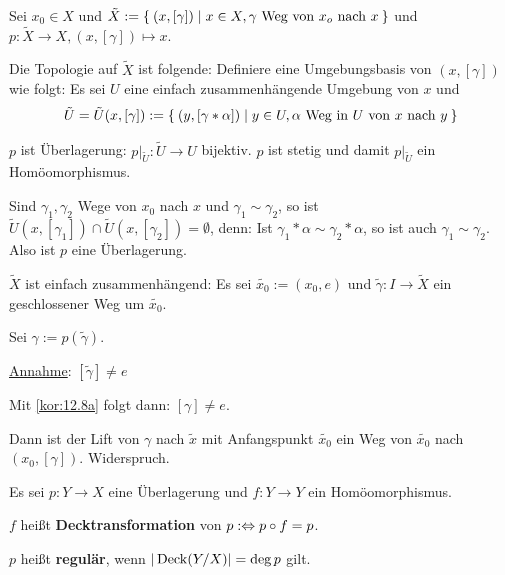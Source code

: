 \begin{beweis}
    Sei $x_0 \in X$ und $\tilde{X} := \Set{(x, [\gamma]) | x \in X, \gamma \text{ Weg von } x_o \text{ nach } x}$
    und $p: \tilde{X} \rightarrow X, (x, [\gamma]) \mapsto x$.

    Die Topologie auf $\tilde{X}$ ist folgende:
    Definiere eine Umgebungsbasis von $(x, [\gamma])$ wie folgt:
    Es sei $U$ eine einfach zusammenhängende Umgebung von $x$ und
    \[\tilde{U} = \tilde{U}(x, [\gamma]) := \Set{(y, [\gamma * \alpha]) | y \in U, \alpha \text{ Weg in } U \text{ von } x \text{ nach } y} \]

    $p$ ist Überlagerung: $p|_{\tilde{U}} : \tilde{U} \rightarrow U$
    bijektiv. $p$ ist stetig und damit $p|_{\tilde{U}}$ ein 
    Homöomorphismus.

    Sind $\gamma_1, \gamma_2$ Wege von $x_0$ nach $x$ und $\gamma_1 \sim \gamma_2$,
    so ist $\tilde{U}(x, [\gamma_1]) \cap \tilde{U}(x, [\gamma_2]) = \emptyset$,
    denn: Ist $\gamma_1 * \alpha \sim \gamma_2 * \alpha$, so ist auch
    $\gamma_1 \sim \gamma_2$. Also ist $p$ eine Überlagerung.

    $\tilde{X}$ ist einfach zusammenhängend: Es sei $\tilde{x_0} := (x_0, e)$
    und $\tilde{\gamma}: I \rightarrow \tilde{X}$ ein geschlossener
    Weg um $\tilde{x_0}$.

    Sei $\gamma := p(\tilde{\gamma})$.

    \underline{Annahme}: $[\tilde{\gamma}] \neq e$

    Mit \cref{kor:12.8a} folgt dann: $[\gamma] \neq e$.

    Dann ist der Lift von $\gamma$ nach $\tilde{x}$ mit Anfangspunkt
    $\tilde{x_0}$ ein Weg von $\tilde{x_0}$ nach $(x_0, [\gamma])$.
    Widerspruch.
\end{beweis}

\begin{definition}%
    Es sei $p:Y \rightarrow X$ eine Überlagerung und $f:Y \rightarrow Y$
    ein Homöomorphismus.

    \begin{defenum}
        \item $f$ heißt \textbf{Decktransformation} von $p :\Leftrightarrow p \circ f = p$.
        \item $p$ heißt \textbf{regulär}, wenn $|\operatorname{Deck}(Y/X)| = \deg{p}$ gilt.
    \end{defenum}
\end{definition}

